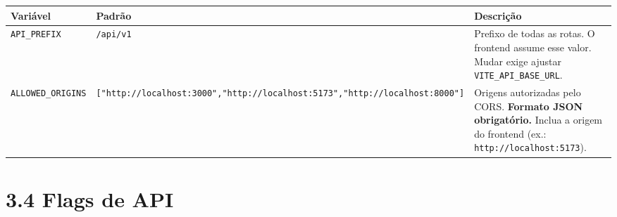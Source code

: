 \documentclass[
  brazilian,
  a4paper,12pt,oneside]{report}
\newcounter{none} %
\begin{document}
{\def\LTcaptype{none} %
\begin{longtable}[]{@{}
  >{\raggedright\arraybackslash}p{}
  >{\raggedright\arraybackslash}p{}
  >{\raggedright\arraybackslash}p{}@{}}
\toprule\noalign{}
\begin{minipage}[b]{\linewidth}\raggedright
Variável
\end{minipage} & \begin{minipage}[b]{\linewidth}\raggedright
Padrão
\end{minipage} & \begin{minipage}[b]{\linewidth}\raggedright
Descrição
\end{minipage} \\
\midrule\noalign{}
\endhead
\bottomrule\noalign{}
\endlastfoot
\texttt{API\_}\allowbreak{}\texttt{PREFIX} &
\texttt{/}\allowbreak{}\texttt{api/}\allowbreak{}\texttt{v1} & Prefixo
de todas as rotas. O frontend assume esse valor. Mudar exige ajustar
\texttt{VITE\_}\allowbreak{}\texttt{API\_}\allowbreak{}\texttt{BASE\_}\allowbreak{}\texttt{URL}. \\
\texttt{ALLOWED\_}\allowbreak{}\texttt{ORIGINS} &
\texttt{{[}"http:}\allowbreak{}\texttt{/}\allowbreak{}\texttt{/}\allowbreak{}\texttt{localhost:}\allowbreak{}\texttt{3000","http:}\allowbreak{}\texttt{/}\allowbreak{}\texttt{/}\allowbreak{}\texttt{localhost:}\allowbreak{}\texttt{5173","http:}\allowbreak{}\texttt{/}\allowbreak{}\texttt{/}\allowbreak{}\texttt{localhost:}\allowbreak{}\texttt{8000"{]}}
& Origens autorizadas pelo CORS. \textbf{Formato JSON obrigatório.}
Inclua a origem do frontend (ex.:
\texttt{http:}\allowbreak{}\texttt{/}\allowbreak{}\texttt{/}\allowbreak{}\texttt{localhost:}\allowbreak{}\texttt{5173}). \\
\end{longtable}
}

\section{3.4 Flags de API}\label{flags-de-api}
\end{document}
